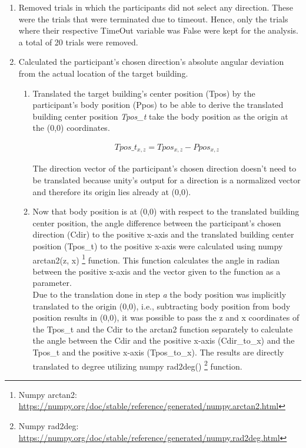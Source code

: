 \begin{enumerate}
	\item Removed trials in which the participants did not select any direction. These were the trials that were terminated due to timeout. Hence, only the trials where their respective TimeOut variable was False were kept for the analysis. a total of 20 trials were removed. \\
	
	\item Calculated the participant's chosen direction's absolute angular deviation from the actual location of the target building.
	
	\begin{enumerate}
		\item Translated the target building's center position {\emphasize(Tpos)} by the participant's body position {\emphasize(Ppos)} to be able to derive the translated building center position {\emph{Tpos\_t}} take the body position as the origin at the (0,0) coordinates.
		
			\begin{align*}
				Tpos\_t_{x,z}= Tpos_{x,z} - Ppos_{x,z}
			\end{align*}
		
		The direction vector of the participant's chosen direction doesn't need to be translated because unity's output for a direction is a normalized vector and therefore its origin lies already at (0,0).\\
		
		\item Now that body position is at (0,0) with respect to the translated building center position, the angle difference between the participant's chosen direction {\emphasize(Cdir)} to the positive x-axis and the translated building center position {\emphasize(Tpos\_t)} to the positive x-axis were calculated using numpy arctan2(z, x) \footnote{Numpy arctan2: \href{https://numpy.org/doc/stable/reference/generated/numpy.arctan2.html}{https://numpy.org/doc/stable/reference/generated/numpy.arctan2.html}} function. This function calculates the angle in radian between the positive x-axis and the vector given to the function as a parameter. \\
		
		Due to the translation done in step \emph{a} the body position was implicitly translated to the origin (0,0), i.e., subtracting body position from body position results in (0,0), it was possible to pass the z and x coordinates of the {\emphasize Tpos\_t} and the {\emphasize Cdir} to the arctan2 function separately to calculate the angle between the {\emphasize Cdir} and the positive x-axis {\emphasize (Cdir\_to\_x)} and the {\emphasize Tpos\_t} and the positive x-axis {\emphasize (Tpos\_to\_x)}. The results are directly translated to degree utilizing numpy rad2deg() \footnote{Numpy rad2deg: \href{https://numpy.org/doc/stable/reference/generated/numpy.rad2deg.html}{https://numpy.org/doc/stable/reference/generated/numpy.rad2deg.html}} function.
	

\end{enumerate}
\end{enumerate}
